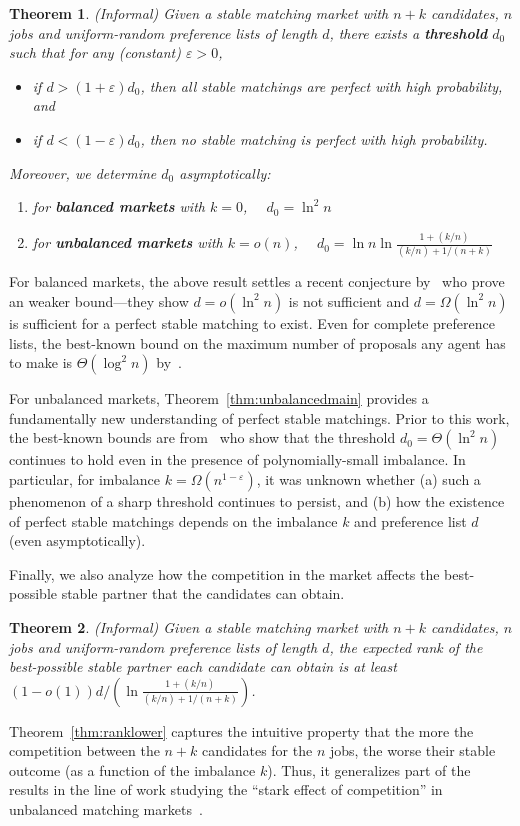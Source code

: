 \documentclass[11pt]{amsart}
\newtheorem*{theorem*}{Theorem}
\renewcommand{\epsilon}{\varepsilon}
\newcommand{\defn}{\textbf}
\begin{document}
\begin{theorem*}(Informal)
Given a stable matching market with $n+k$ candidates, $n$ jobs and uniform-random preference lists of length $d$, there exists a \defn{threshold} $d_0$ such that for any (constant) $\epsilon > 0$, 
\begin{itemize}
\item if $d > (1 + \epsilon)d_0$, then all stable matchings are {perfect} with high probability, and
\item if $d < (1 - \epsilon)d_0$, then no stable matching is perfect  with high probability.
\end{itemize}
Moreover, we determine $d_0$ asymptotically:

\begin{enumerate}
    \item\label{part:balanced} for \defn{\em balanced markets} with $k = 0$,~~ $d_0 = \ln^2 n$
    \item\label{part:unbalanced} for \defn{\em unbalanced markets} with $k = o(n)$,~~ $d_0 = \ln n \ln \frac{1 +(k/n)}{(k/n) + 1/(n+k)}$
\end{enumerate}
\end{theorem*}


For balanced markets, the above result settles a recent conjecture by~\cite{kanoria2021matching} who prove an weaker bound---they show $d = o(\ln^2 n)$ is not sufficient and $d = \Omega(\ln^2 n)$ is sufficient for a perfect stable matching to exist.  Even for complete preference lists, the best-known bound on the maximum number of proposals any agent has to make is $\Theta(\log^2 n)$ by~\cite{pittel2019likely}.

For unbalanced markets, Theorem~\ref{thm:unbalancedmain} provides a fundamentally new understanding of perfect stable matchings. Prior to this work, the best-known bounds are from~\cite{kanoria2021matching} who show that the threshold $d_0 = \Theta(\ln^ 2 n)$ continues to hold even in the presence of polynomially-small imbalance.  In particular, for imbalance $k = \Omega(n^{1-\epsilon})$, it was unknown whether (a) such a phenomenon of a sharp threshold continues to persist, and (b) how the existence of perfect stable matchings depends on the imbalance $k$ and preference list $d$ (even asymptotically). 

Finally, we also analyze how the competition in the market affects the best-possible stable partner that the candidates can obtain.


 \begin{theorem*}(Informal)
Given a stable matching market with $n+k$ candidates, $n$ jobs and uniform-random preference lists of length $d$, the expected rank of the best-possible stable partner each candidate can obtain is at least $(1-o(1)) d/(\ln \frac{1 +(k/n)}{(k/n) + 1/(n+k)})$.
\end{theorem*}
 Theorem~\ref{thm:ranklower} captures the intuitive property that the more the competition between the $n+k$ candidates for the $n$ jobs, the worse their stable outcome (as a function of the imbalance $k$).  Thus, it generalizes part of the results in the line of work studying the ``stark effect of competition'' in unbalanced matching markets~\cite{ashlagi2017unbalanced, cai2022short, kanoria2021matching}.
\end{document}
